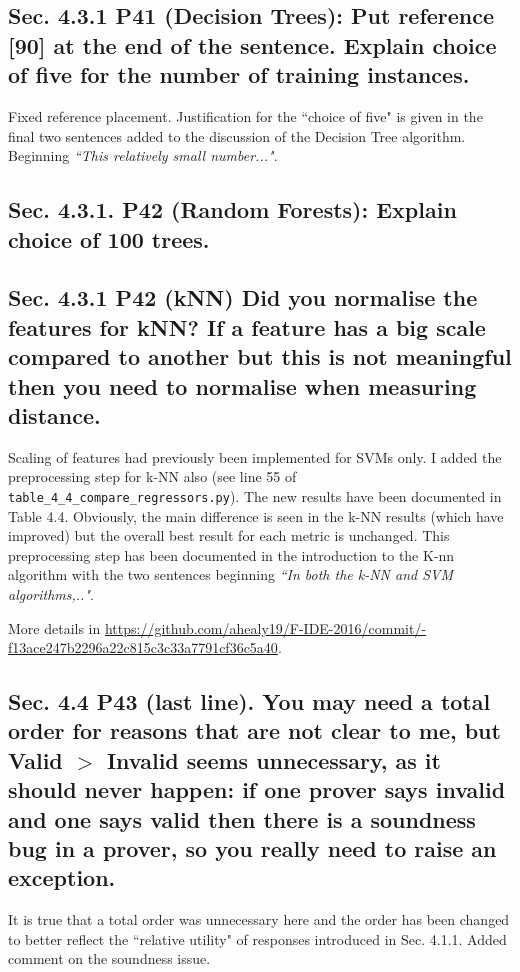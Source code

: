 \documentclass[]{article}
\begin{document}
\subsection{Sec. 4.3.1 P41 (Decision Trees): Put reference [90] at the end of the sentence. Explain choice of five for the number of training instances.}

Fixed reference placement. Justification for the ``choice of five" is given in the final two sentences added to the discussion of the Decision Tree algorithm. Beginning \emph{``This relatively small number..."}. 

\subsection{Sec. 4.3.1. P42 (Random Forests): Explain choice of 100 trees.} 
	
\subsection{Sec. 4.3.1 P42 (kNN) Did you normalise the features for kNN? If a feature has a big scale compared to another but this is not meaningful then you need to normalise when measuring distance.}

Scaling of features had previously been implemented for SVMs only. I added the preprocessing step for k-NN also (see line 55 of \texttt{table\_4\_4\_compare\_regressors.py}). 
The new results have been documented in Table 4.4. 
Obviously, the main difference is seen in the k-NN results (which have improved) but the overall best result for each metric is unchanged.
This preprocessing step has been documented in the introduction to the K-nn algorithm with the two sentences beginning \emph{``In both the k-NN and SVM algorithms,.."}. 

\sloppypar
More details in \url{https://github.com/ahealy19/F-IDE-2016/commit/-f13ace247b2296a22c815c3c33a7791cf36c5a40}.

\subsection{Sec. 4.4 P43 (last line). You may need a total order for reasons that are not clear to me, but Valid $>$ Invalid seems unnecessary, as it should never happen: if one prover says invalid and one says valid then there is a soundness bug in a prover, so you really need to raise an exception.}

It is true that a total order was unnecessary here and the order has been changed to better reflect the ``relative utility" of responses introduced in Sec. 4.1.1. 
Added comment on the soundness issue.
\end{document}
